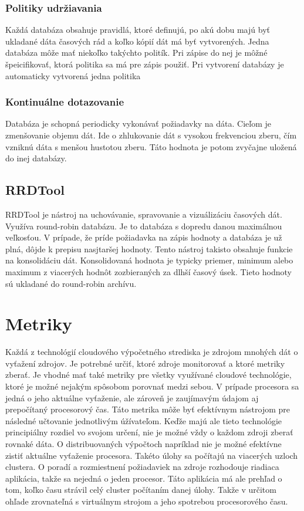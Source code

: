 \documentclass[11pt,final,oneside]{fithesis}
\begin{document}
\subsection{Politiky udržiavania}
Každá databáza obsahuje pravidlá, ktoré definujú, po akú dobu majú byť ukladané dáta časových rád a koľko kópií dát má byť vytvorených. Jedna databáza môže mať niekoľko takýchto politík. Pri zápise 
do nej je môžné špeicifikovať, ktorá politika sa má pre zápis použiť. Pri vytvorení databázy je automaticky vytvorená jedna politika

\subsection{Kontinuálne dotazovanie}
Databáza je schopná periodicky vykonávať požiadavky na dáta. Cieľom je zmenšovanie objemu dát. Ide o zhlukovanie dát s vysokou frekvenciou zberu, čím vzniknú dáta s menšou hustotou zberu. Táto hodnota je 
potom zvyčajne uložená do inej databázy.

\section{RRDTool}
RRDTool je nástroj na uchovávanie, spravovanie a vizuálizáciu časových dát. Využíva round-robin databázu. Je to databáza s dopredu danou maximálnou veľkosťou. V prípade, že príde požiadavka na zápis hodnoty 
a databáza je už plná, dôjde k prepisu nasjtaršej hodnoty. Tento nástroj takisto obsahuje funkcie na konsolidáciu dát. Konsolidovaná hodnota je typicky priemer, minimum alebo maximum z viacerých hodnôt zozbieraných 
za dlhší časový úsek. Tieto hodnoty sú ukladané do round-robin archívu.



\chapter{Metriky}
Každá z technológií cloudového výpočetného strediska je zdrojom mnohých dát o vyťažení zdrojov. Je potrebné určiť, ktoré zdroje monitorovať a ktoré metriky zberať. Je vhodné mať také metriky pre všetky využívané cloudové technológie,
ktoré je možné nejakým spôsobom porovnať medzi sebou. V prípade procesora sa jedná o jeho aktuálne vyťaženie, ale zároveň je zaujímavým údajom aj prepočítaný procesorový čas. Táto metrika môže byť efektívnym
nástrojom pre následné učtovanie jednotlivým úžívateľom. Keďže majú ale tieto technológie principiálny rozdiel vo svojom určení, nie je možné vždy o každom zdroji zberať rovnaké dáta. 
O distribuovaných výpočtoch napríklad nie je možné efektívne zistiť aktuálne vyťaženie procesora. Takéto úlohy sa počítajú na viacerých uzloch clustera. O poradí a rozmiestnení požiadaviek na zdroje
rozhodouje riadiaca aplikácia, takže sa nejedná o jeden procesor. Táto aplikácia má ale prehľad o tom, koľko času strávil celý cluster počítaním danej úlohy. Takže v určitom ohľade zrovnateľná s virtuálnym
strojom a jeho spotrebou procesorového času.
\end{document}
